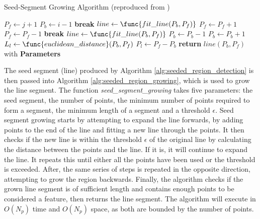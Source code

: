 \documentclass[12pt]{article}
\begin{document}
\begin{algorithm}[H]
    \caption{Seed-Segment Growing Algorithm (reproduced from \cite{seeded_region_growing})}\label{alg:seeded_region_growing}
    \begin{algorithmic}
            \State $P_f \gets j + 1$
            \State $P_b \gets i - 1$
                    \State \textbf{break}
                \Else
                    \State $line \gets \func{fit\_line(P_b, P_f)}$
                \EndIf
                \State $P_f \gets P_f + 1$
            \EndWhile
            \State $P_f \gets P_f - 1$
                    \State \textbf{break}
                \Else
                    \State $line \gets \func{fit\_line(P_b, P_f)}$
                \EndIf
                \State $P_b \gets P_b - 1$
            \EndWhile
            \State $P_b \gets P_b + 1$
            \State $L_l \gets \func{euclidean\_distance}(P_b, P_f)$
            \State $P_l \gets P_f - P_b$
                \State \textbf{return} $line(P_b, P_f)$ with \textbf{Parameters}
            \EndIf
        \EndFunction{}
    \end{algorithmic}
\end{algorithm}
The seed segment (line) produced by Algorithm \ref{alg:seeded_region_detection} is then passed into Algorithm \ref{alg:seeded_region_growing},
which is used to grow the line segment. The function \textit{seed\_segment\_growing} takes five parameters: the seed segment, the number of points,
the minimum number of points required to form a segment, the minimum length of a segment and a threshold $\epsilon$.  Seed segment growing
starts by attempting to expand the line forwards, by adding points to the end of the line and fitting a new line through the points. It then checks
if the new line is within the threshold $\epsilon$ of the original line by calculating the distance between the points and the line. If it is, it will continue
to expand the line. It repeats this until either all the points have been used or the threshold is exceeded. After, the same series of steps is repeated in
the opposite direction, attempting to grow the region backwards. Finally, the algorithm checks if the grown line segment is of sufficient length and
contains enough points to be considered a feature, then returns the line segment. The algorithm will execute in \(O(N_p)\) time and \(O(N_p)\) space,
as both are bounded by the number of points.\\
\end{document}
